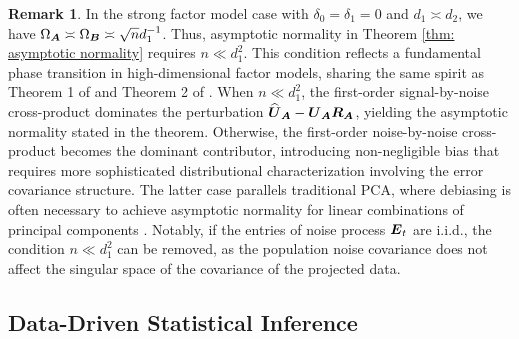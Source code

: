 \documentclass[11pt,letterpaper]{article}
\theoremstyle{definition}
\newtheorem{remark}{Remark}
\begin{document}
\begin{remark}
In the strong factor model case with $\delta_0 = \delta_1 = 0$ and $d_1 \asymp d_2$, we have $\Omega_{\boldsymbol{A}} \asymp \Omega_{\boldsymbol{B}} \asymp \sqrt{n} d_1^{-1}$. Thus, asymptotic normality in Theorem \ref{thm: asymptotic normality} requires $n \ll d_1^2$.
This condition reflects a fundamental phase transition in high-dimensional factor models, sharing the same spirit as Theorem 1 of \cite{bai2003inferential} and Theorem 2 of  \cite{chen2023statistical}. When $n \ll d_1^2$, the first-order signal-by-noise cross-product dominates the perturbation $\widehat{\boldsymbol{U}}_{\boldsymbol{A}} - \boldsymbol{U}_{\boldsymbol{A}}\boldsymbol{R}_{\boldsymbol{A}}$, yielding the asymptotic normality stated in the theorem. Otherwise, the first-order noise-by-noise cross-product becomes the dominant contributor, introducing non-negligible bias that requires more sophisticated distributional characterization involving the error covariance structure. The latter case parallels traditional PCA, where debiasing is often necessary to achieve asymptotic normality for linear combinations of principal components \citep{koltchinskii2020efficient}. Notably, if the entries of noise process $\boldsymbol{E}_t$ are i.i.d., the condition $n \ll d_1^2$ can be removed, as the population noise covariance does not affect the singular space of the covariance of the projected data.


\end{remark}




\subsection{Data-Driven Statistical Inference}
\end{document}
